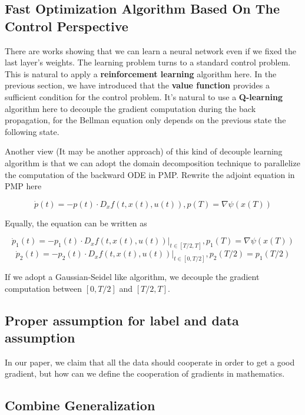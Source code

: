 \documentclass{article}
\theoremstyle{plain}
\theoremstyle{definition}
\begin{document}
\subsection{Fast Optimization Algorithm Based On The Control Perspective}

There are works showing that we can learn a neural network even if we fixed the last layer's weights. The learning problem turns to a standard control problem. This is natural to apply a \textbf{reinforcement learning} algorithm here. In the previous section, we have introduced that the \textbf{value function} provides a sufficient condition for the control problem. It's natural to use a \textbf{Q-learning} algorithm here to decouple the gradient computation during the back propagation, for the Bellman equation only depends on the previous state the following state.


Another view (It may be another approach) of this kind of decouple learning algorithm is that we can adopt the domain decomposition technique to parallelize the computation of the backward ODE in PMP. Rewrite the adjoint equation in PMP here

$$
\dot p(t) = -p(t)\cdot D_xf(t,x(t),u(t)),p(T)=\nabla \psi(x(T))
$$

Equally, the equation can be written as

$$
\dot p_1(t) = -p_1(t)\cdot D_xf(t,x(t),u(t))|_{t\in[T/2,T]},p_1(T)=\nabla \psi(x(T))$$
$$
\dot p_2(t) = -p_2(t)\cdot D_xf(t,x(t),u(t))|_{t\in[0,T/2]},p_2(T/2)=p_1(T/2)
$$

If we adopt a Gaussian-Seidel like algorithm, we decouple the gradient computation between $[0,T/2]$ and $[T/2,T]$.

\subsection{Proper assumption for label and data assumption}

In our paper, we claim that all the data should cooperate in order to get a good gradient, but how can we define the cooperation of gradients in mathematics.

\subsection{Combine Generalization}




\end{document}
